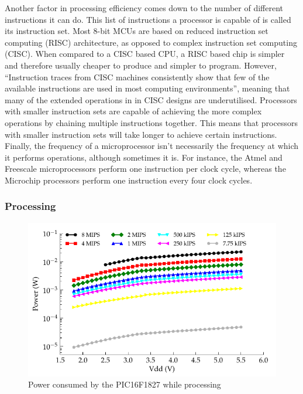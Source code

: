       Another factor in processing efficiency comes down to the number of different instructions it can do.
      This list of instructions a processor is capable of is called its instruction set.
      Most 8-bit MCUs are based on reduced instruction set computing (RISC) architecture, as opposed to complex instruction set computing (CISC).
      When compared to a CISC based CPU, a RISC based chip is simpler and therefore usually cheaper to produce and simpler to program.
      However, ``Instruction traces from CISC machines consistently show that few of the available instructions are used in most computing environments''\cite{ComputerArch}, meaning that many of the extended operations in in CISC designs are underutilised.
      Processors with smaller instruction sets are capable of achieving the more complex operations by chaining multiple instructions together.
      This means that processors with smaller instruction sets will take longer to achieve certain instructions.
      Finally, the frequency of a microprocessor isn't necessarily the frequency at which it performs operations, although sometimes it is.
      For instance, the Atmel and Freescale microprocessors perform one instruction per clock cycle, whereas the Microchip processors perform one instruction every four clock cycles.


    \subsubsection{Processing}

      \begin{figure}
        \centering
        \includegraphics{content/pt1/03-EnergyRequirements/graphics/Graph_PIC16F1827_Clock_Power}
        \caption{\label{graph:CLK_POWER_16F1827}Power consumed by the PIC16F1827 while processing}
      \end{figure}

